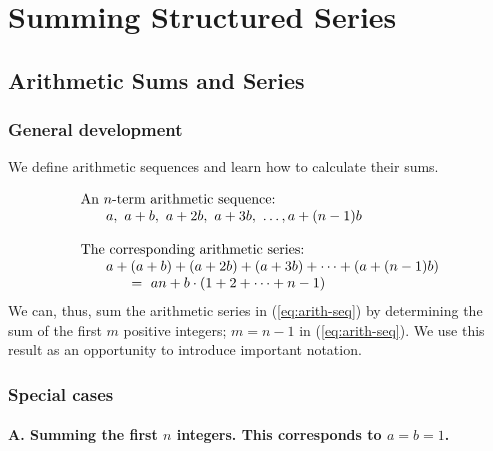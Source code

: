 \section{Summing Structured Series}
\label{sec:structured-series}

\subsection{Arithmetic Sums and Series}
\label{sec:arithmetic-series}

\subsubsection{General development}

We define arithmetic sequences and learn how to calculate their sums.

\begin{equation}
\label{eq:arith-seq}
\begin{array}{l}
\mbox{An $n$-term arithmetic sequence:} \\
\hspace*{.25in}a, \ a+b, \ a+2b, \ a+3b, \ \ldots, a+(n-1)b \\
\\
\mbox{The corresponding arithmetic series:} \\
\hspace*{.25in}a + (a+b) + (a+2b) + (a+3b) + \cdots + (a+(n-1)b) \\
\hspace*{.5in} = \
an + b \cdot (1 + 2 + \cdots + n-1)
\end{array}
\end{equation}
We can, thus, sum the arithmetic series in (\ref{eq:arith-seq}) by
determining the sum of the first $m$ positive integers; $m = n-1$ in
(\ref{eq:arith-seq}).  We use this result as an opportunity to
introduce important notation.

\subsubsection{Special cases}


\paragraph{A. Summing the first $n$ integers. This corresponds to $a=b=1$.}

